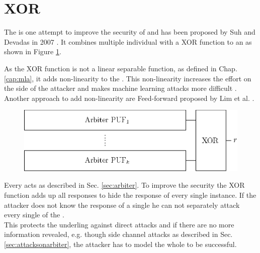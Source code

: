 
\section{\acs{XOR} \apufs}
\label{sec:xorarbiterpufs}

The \xpuf is one attempt to improve the security of \apufs and has been proposed by Suh and Devadas in 2007 \cite{Suh2007PhysicalGeneration}.
It combines multiple individual \apufs with a \acf{XOR} function to an \xpuf as shown in Figure \ref{fig:xorarbiter}.

As the \ac{XOR} function is not a linear separable function, as defined in Chap. \ref{cap:mla}, it adds non-linearity to the \puf. 
This non-linearity increases the effort on the side of the attacker and makes machine learning attacks more difficult \cite{Greibach2010OnBifurcation, Lim2005ExtractingCircuits}.
Another approach to add non-linearity are Feed-forward \apufs proposed by Lim et al. \cite{Lim2005ExtractingCircuits}.

\begin{figure}[ht]
\centering
\includegraphics[width=1.00\textwidth]{images/xor_arbiter.eps}
\caption[\acs{XOR} \apuf]{\xpuf}
\label{fig:xorarbiter}
\end{figure}

Every \apuf acts as described in Sec. \ref{sec:arbiter}. 
To improve the security the \ac{XOR} function adds up all responses to hide the response of every single \apuf instance.
If the attacker does not know the response of a single \apuf he can not separately attack every single \apuf of the \xpuf \cite{Becker2015ThePUFs}.\\
This protects the underling \apufs against direct attacks and if there are no more information revealed, e.g. though side channel attacks as described in Sec. \ref{sec:attacksonarbiter}, the attacker has to model the whole \xpuf to be successful.

